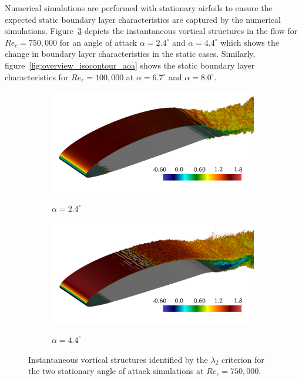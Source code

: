 Numerical simulations are performed with stationary airfoils to ensure the expected static boundary layer characteristics are captured by the numerical simulations.  Figure~\ref{fig:overview_la2_750k_stationary} depicts the instantaneous vortical structures in the flow for $Re_{c}=750,000$ for an angle of attack $\alpha=2.4^{\circ}$ and $\alpha=4.4^{\circ}$ which shows the change in boundary layer characteristics in the static cases. Similarly, figure~\ref{fig:overview_isocontour_aoa} shows the static boundary layer characteristics for $Re_{c}=100,000$ at $\alpha=6.7^{\circ}$ and $\alpha=8.0^{\circ}$.
\begin{figure}[h]
	\centering
	\begin{subfigure}[t]{0.49\textwidth}
		\caption{$\alpha=2.4^{\circ}$}		
		\includegraphics[width=1\textwidth]{paper2/imgs2/pitch_re750k0001}
		\label{fig:overview_la2_aoa24}
	\end{subfigure}
	\begin{subfigure}[t]{0.49\textwidth}
		\caption{$\alpha=4.4^{\circ}$}		
		\includegraphics[width=1\textwidth]{paper2/imgs2/pitch_re750k0002}
		\label{fig:overview_la2_aoa44}		
	\end{subfigure}	
	\caption{Instantaneous vortical structures identified by the $\lambda_{2}$ criterion for the two stationary angle of attack simulations at $Re_{c}=750,000$.}
	\label{fig:overview_la2_750k_stationary}
\end{figure}


